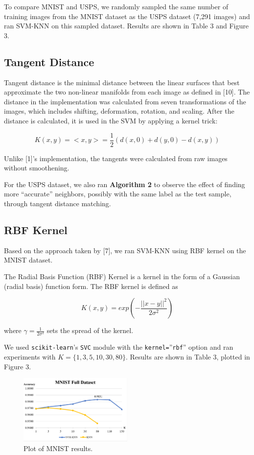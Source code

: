 \documentclass[11pt,letterpaper]{article}
\begin{document}
To compare MNIST and USPS, we randomly sampled the same number of training images from the MNIST dataset as the USPS dataset (7,291 images) and ran SVM-KNN on this sampled dataset. Results are shown in Table 3 and Figure 3.

\subsection{Tangent Distance}

Tangent distance is the minimal distance between the linear surfaces that best approximate the two non-linear manifolds from each image as defined in [10]. The distance in the implementation was calculated from seven transformations of the images, which includes shifting, deformation, rotation, and scaling. After the distance is calculated, it is used in the SVM by applying a kernel trick:

$$K(x,y)=<x,y>=\frac{1}{2}(d(x,0)+d(y,0)-d(x,y))$$

Unlike [1]'s implementation, the tangents were calculated from raw images without smoothening.


For the USPS dataset, we also ran \textbf{Algorithm 2} to observe the effect of finding more ``accurate'' neighbors, possibly with the same label as the test sample, through tangent distance matching.

\subsection{RBF Kernel}

Based on the approach taken by [7], we ran SVM-KNN using RBF kernel on the MNIST dataset.

The Radial Basis Function (RBF) Kernel is a kernel in the form of a Gaussian (radial basis) function form. The RBF kernel is defined as 

$$K(x, y) = exp\left(-\frac{||x-y||^2}{2\sigma^2}\right)$$

where $\gamma=\frac{1}{2\sigma^2}$ sets the spread of the kernel.

We used {\tt scikit-learn}'s {\tt SVC} module with the {\tt kernel=}''{\tt rbf}'' option and ran experiments with $K=\{1,3,5,10,30,80\}$. Results are shown in Table 3, plotted in Figure 3.

\begin{figure}[t!]
  \centering
  \includegraphics[keepaspectratio, width=0.5\textwidth]{mnist_full.png}
  \caption{Plot of MNIST results.}
\end{figure}
\end{document}
